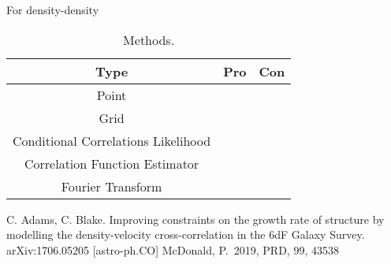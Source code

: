 \documentclass{article}
\begin{document}
For density-density 

\begin{table}[htbp]
   \centering
   \begin{tabular}{|c|c|c|} %
   	\hline
	Type & Pro & Con \\ \hline
	Point & \\
	Grid & \\
	Conditional Correlations Likelihood & \\
	Correlation Function Estimator & \\
	Fourier Transform & \\
	\hline
   \end{tabular}
   \caption{Methods.}
   \label{tab:booktabs}
\end{table}
\newpage
\begin{thebibliography}{9}
C. Adams, C. Blake. 
Improving constraints on the growth rate of structure by modelling the density-velocity cross-correlation in the 6dF Galaxy Survey. arXiv:1706.05205 [astro-ph.CO]
 McDonald, P.\ 2019, PRD, 99, 43538
\end{thebibliography}
\end{document}
